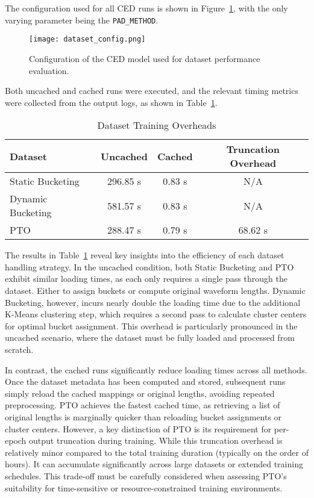 The configuration used for all CED runs is shown in Figure~\ref{fig:dataset_config}, with the only varying parameter being the \texttt{PAD\_METHOD}.

\begin{figure}[H]
    \centering
    \texttt{[image: dataset\_config.png]}
    \caption{\label{fig:dataset_config} Configuration of the CED model used for dataset performance evaluation.}
\end{figure}

Both uncached and cached runs were executed, and the relevant timing metrics were collected from the output logs, as shown in Table~\ref{tab:dataset_loading_times}.

\vspace{1em}
\begin{table}[H]
\centering
\caption{Dataset Training Overheads}
\label{tab:dataset_loading_times}
\begin{tabular}{|l|c|c|c|}
\hline
\textbf{Dataset} & \textbf{Uncached} & \textbf{Cached} & \textbf{Truncation Overhead} \\
\hline
Static Bucketing  & 296.85 s  & 0.83 s   & N/A    \\
Dynamic Bucketing & 581.57 s& 0.83 s  & N/A    \\
PTO               & 288.47 s & 0.79 s  & 68.62 s  \\
\hline
\end{tabular}
\end{table}

The results in Table~\ref{tab:dataset_loading_times} reveal key insights into the efficiency of each dataset handling strategy. In the uncached condition, both Static Bucketing and PTO exhibit similar loading times, as each only requires a single pass through the dataset. Either to assign buckets or compute original waveform lengths. Dynamic Bucketing, however, incurs nearly double the loading time due to the additional K-Means clustering step, which requires a second pass to calculate cluster centers for optimal bucket assignment. This overhead is particularly pronounced in the uncached scenario, where the dataset must be fully loaded and processed from scratch.

In contrast, the cached runs significantly reduce loading times across all methods. Once the dataset metadata has been computed and stored, subsequent runs simply reload the cached mappings or original lengths, avoiding repeated preprocessing. PTO achieves the fastest cached time, as retrieving a list of original lengths is marginally quicker than reloading bucket assignments or cluster centers. However, a key distinction of PTO is its requirement for per-epoch output truncation during training. While this truncation overhead is relatively minor compared to the total training duration (typically on the order of hours). It can accumulate significantly across large datasets or extended training schedules. This trade-off must be carefully considered when assessing PTO's suitability for time-sensitive or resource-constrained training environments.

